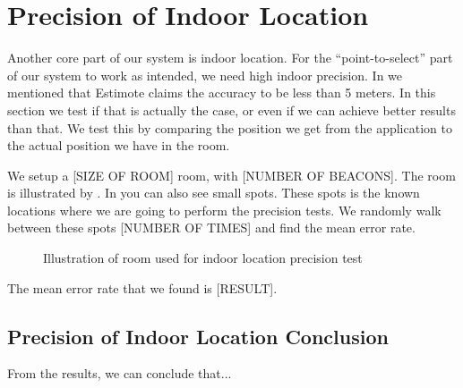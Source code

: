 \section{Precision of Indoor Location}
Another core part of our system is indoor location. 
For the ``point-to-select'' part of our system to work as intended, we need high indoor precision. 
In  we mentioned that Estimote claims the accuracy to be less than \num{5} meters.
In this section we test if that is actually the case, or even if we can achieve better results than that. 
We test this by comparing the position we get from the application to the actual position we have in the room. 

We setup a [SIZE OF ROOM] room, with [NUMBER OF BEACONS]. 
The room is illustrated by . 
In  you can also see small spots. 
These spots is the known locations where we are going to perform the precision tests. 
We randomly walk between these spots [NUMBER OF TIMES] and find the mean error rate.
\begin{figure}[!htb]
    \centering
    \caption{Illustration of room used for indoor location precision test}
    \label{fig:precisiontest}
\end{figure}

The mean error rate that we found is [RESULT]. 

\subsection{Precision of Indoor Location Conclusion}
From the results, we can conclude that... 

